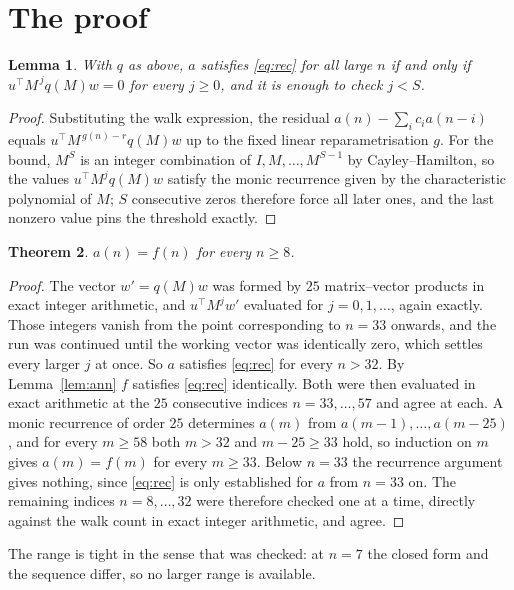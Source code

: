 \documentclass[11pt,a4paper]{article}
\theoremstyle{plain}
\newtheorem{theorem}{Theorem}
\newtheorem{lemma}[theorem]{Lemma}
\theoremstyle{definition}
\begin{document}
\section{The proof}

\begin{lemma}\label{lem:crit}
With $q$ as above, $a$ satisfies \eqref{eq:rec} for all large $n$ if and only if
$u^{\!\top}M^{\,j}q(M)w=0$ for every $j\ge0$, and it is enough to check $j<S$.
\end{lemma}

\begin{proof}
Substituting the walk expression, the residual $a(n)-\sum_ic_ia(n-i)$ equals
$u^{\!\top}M^{\,g(n)-r}q(M)w$ up to the fixed linear reparametrisation $g$. For the bound,
$M^{S}$ is an integer combination of $I,M,\dots,M^{S-1}$ by Cayley--Hamilton, so the values
$u^{\!\top}M^{j}q(M)w$ satisfy the monic recurrence given by the characteristic polynomial of
$M$; $S$ consecutive zeros therefore force all later ones, and the last nonzero value pins the
threshold exactly.
\end{proof}

\begin{theorem}
$a(n)=f(n)$ for every $n\ge8$.
\end{theorem}

\begin{proof}
The vector $w'=q(M)w$ was formed by $25$ matrix--vector products in exact integer
arithmetic, and $u^{\!\top}M^{j}w'$ evaluated for $j=0,1,\dots$, again exactly. Those integers
vanish from the point corresponding to $n=33$ onwards, and the run was continued until the
working vector was identically zero, which settles every larger $j$ at once. So $a$ satisfies
\eqref{eq:rec} for every $n>32$. By Lemma~\ref{lem:ann} $f$ satisfies \eqref{eq:rec}
identically. Both were then evaluated in exact arithmetic at the $25$ consecutive indices
$n=33,\dots,57$ and agree at each. A monic recurrence of order $25$
determines $a(m)$ from $a(m-1),\dots,a(m-25)$, and for every $m\ge58$ both
$m>32$ and $m-25\ge33$ hold, so induction on $m$ gives $a(m)=f(m)$ for every
$m\ge33$.
Below $n=33$ the recurrence argument gives nothing, since \eqref{eq:rec} is only
established for $a$ from $n=33$ on. The remaining indices $n=8,\dots,32$ were
therefore checked one at a time, directly against the walk count in exact integer arithmetic,
and agree.
\end{proof}

The range is tight in the sense that was checked: at $n=7$ the closed form and the sequence differ, so no larger range is available.
\end{document}
